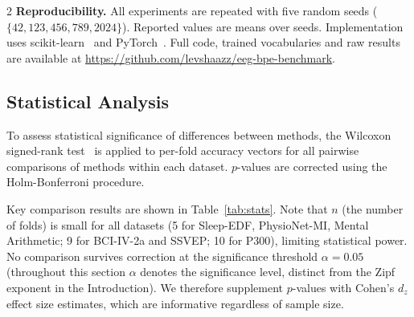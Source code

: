 \documentclass[14pt,a4paper]{extarticle}
\begin{document}
\begin{multicols}{2}
\textbf{Reproducibility.}
All experiments are repeated with five random seeds
($\{42, 123, 456, 789, 2024\}$).
Reported values are means over seeds.
Implementation uses scikit-learn~\cite{pedregosa2011sklearn} and
PyTorch~\cite{paszke2019pytorch}.
Full code, trained vocabularies and raw results are available
at \url{https://github.com/levshaazz/eeg-bpe-benchmark}.

\subsection*{Statistical Analysis}

To assess statistical significance of differences between methods,
the Wilcoxon signed-rank test~\cite{wilcoxon1945}
is applied to per-fold accuracy vectors for all pairwise
comparisons of methods within each dataset.
$p$-values are corrected using the Holm-Bonferroni procedure.

Key comparison results are shown in Table~\ref{tab:stats}.
Note that $n$ (the number of folds) is small for all datasets
(5 for Sleep-EDF, PhysioNet-MI, Mental Arithmetic;
9 for BCI-IV-2a and SSVEP; 10 for P300),
limiting statistical power.
No comparison survives correction at the significance threshold $\alpha{=}0.05$
(throughout this section $\alpha$ denotes the significance level,
distinct from the Zipf exponent in the Introduction).
We therefore supplement $p$-values with Cohen's $d_z$
effect size estimates, which are informative regardless of
sample size.

\end{multicols}
\end{document}
